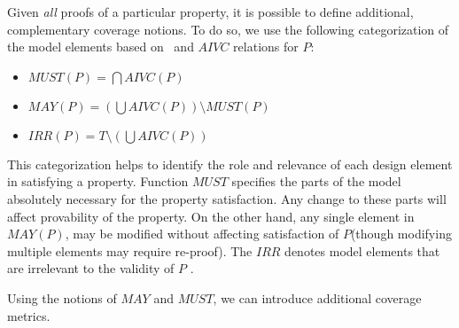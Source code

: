 
Given {\em all} proofs of a particular property, it is possible to define additional, complementary coverage notions.  To do so, we use the following categorization of the model elements based on \mivc ~and $AIVC$ relations for $P$:
\begin{itemize}
%
%
\item $MUST (P) = \bigcap AIVC(P)$
\item $MAY(P) = (\bigcup AIVC (P)) \setminus MUST (P)$
\item $IRR(P) = T \setminus (\bigcup AIVC (P))$
\end{itemize}

\noindent This categorization helps to identify the role and relevance of each design element in satisfying a property. Function $MUST$ specifies the parts of the model absolutely necessary for the property satisfaction.  Any change to these parts will affect provability of the property. On the other hand, any single element in $MAY (P)$, may be modified without affecting satisfaction of $P$(though modifying multiple elements may require re-proof). The $IRR$ denotes model elements that are irrelevant to the validity of $P$ \cite{Murugesan16:renext}.

Using the notions of $MAY$ and $MUST$, we can introduce additional coverage metrics.

